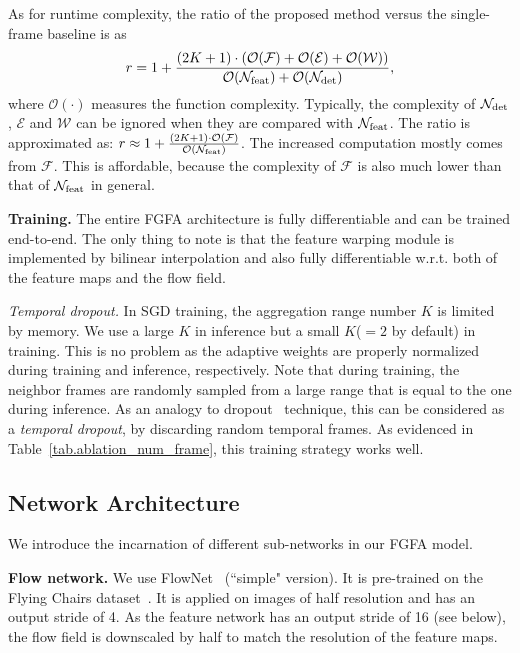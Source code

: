 \documentclass[10pt,twocolumn,letterpaper]{article}
\begin{document}
As for runtime complexity, the ratio of the proposed method versus the single-frame baseline is as
\begin{equation}
r = 1+\frac{(2K+1) \cdot (\mathcal{O}(\mathcal{F}) + \mathcal{O}(\mathcal{E}) + \mathcal{O}(\mathcal{W}))}{\mathcal{O}(\mathcal{N}_{\rm feat}) + \mathcal{O}(\mathcal{N}_{\rm det})},
\end{equation}
where $\mathcal{O}(\cdot)$ measures the function complexity. Typically, the complexity of $\mathcal{N_{\rm det}}$, $\mathcal{E}$ and $\mathcal{W}$ can be ignored when they are compared with $\mathcal{N_{\rm feat}}$. The ratio is approximated as: 
$r \approx 1+\frac{(2K+1) \cdot \mathcal{O}(\mathcal{F})}{\mathcal{O}(\mathcal{N}_{\rm feat})}$. The increased computation mostly comes from $\mathcal{F}$. This is affordable, because the complexity of $\mathcal{F}$ is also much lower than that of $\mathcal{N}_{\rm feat}$ in general.

\textbf{Training.} The entire FGFA architecture is fully differentiable and can be trained end-to-end. The only thing to note is that the feature warping module is implemented by bilinear interpolation and also fully differentiable w.r.t. both of the feature maps and the flow field.

\emph{Temporal dropout.} In SGD training, the aggregation range number $K$ is limited by memory. We use a large $K$ in inference but a small $K$($=2$ by default) in training. This is no problem as the adaptive weights are properly normalized during training and inference, respectively. Note that during training, the neighbor frames are randomly sampled from a large range that is equal to the one during inference. As an analogy to dropout~\cite{srivastava2014dropout} technique, this can be considered as a \emph{temporal dropout}, by discarding random temporal frames. As evidenced in Table~\ref{tab.ablation_num_frame}, this training strategy works well.

\subsection{Network Architecture}

We introduce the incarnation of different sub-networks in our FGFA model.

\textbf{Flow network.} We use FlowNet~\cite{dosovitskiy2015flownet} (``simple" version). It is pre-trained on the Flying Chairs dataset~\cite{dosovitskiy2015flownet}. It is applied on images of half resolution and has an output stride of 4. As the feature network has an output stride of 16 (see below), the flow field is downscaled by half to match the resolution of the feature maps.
\end{document}
